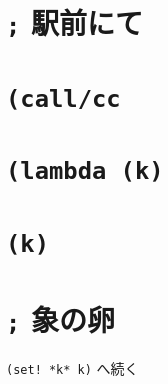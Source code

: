 

\section*{\texttt{;} 駅前にて}


\section*{\texttt{(call/cc}}


\section*{\texttt{(lambda (k)}}


\section*{\texttt{(k)}}


\section*{\texttt{;} 象の卵}


\begin{flushright}
{\texttt{(set! *k* k)}}
へ続く
\end{flushright}

